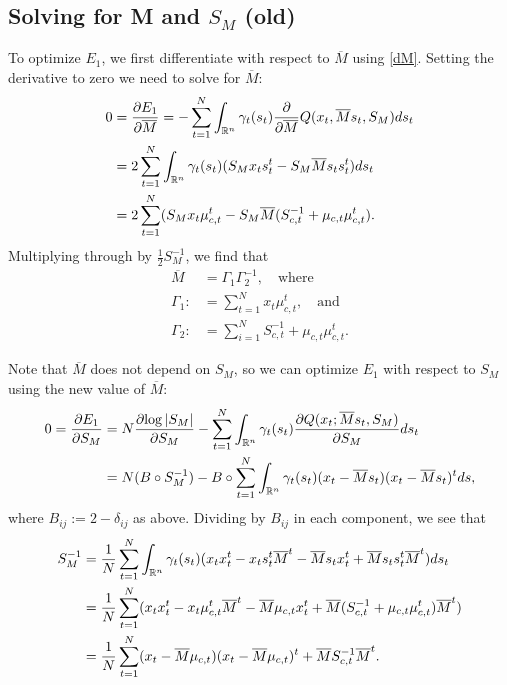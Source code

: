 \documentclass[12pt,leqno]{article}
\begin{document}
\subsection{Solving for M and $S_M$ (old)}
To optimize $E_1$, we first differentiate with respect to $\overline{M}$ using \eqref{dM}.
Setting the derivative to zero we need to solve for $\overline{M}$:
\begin{align*}
  0 &= \frac{\partial{E_1}}{\partial\overline{M}}
  = -\sum_{t=1}^N\int_{{\mathbb R}^n}\gamma_t(s_t)\frac{\partial}{\partial\overline{M}}Q(x_t,\overline{M}s_t,S_M)ds_t\\
  &= 2\sum_{t=1}^N\int_{{\mathbb R}^n}\gamma_t(s_t)(S_Mx_ts_t^t - S_M\overline{M}s_ts_t^t)ds_t\\
  &= 2\sum_{t=1}^N(S_Mx_t\mu_{c,t}^t - S_M\overline{M}(S_{c,t}^{-1} + \mu_{c,t}\mu_{c,t}^t).
\end{align*}
Multiplying through by $\frac{1}{2}S_M^{-1}$, we find that
\begin{equation}\label{M_bar}
  \begin{split}
    \overline{M} &= \Gamma_1\Gamma_2^{-1}, \quad\text{where}\\
    \Gamma_1 :&= \sum_{t=1}^Nx_t\mu_{c,t}^t, \quad\text{and}\\
    \Gamma_2 :&= \sum_{i=1}^NS_{c,t}^{-1} + \mu_{c,t}\mu_{c,t}^t.
  \end{split}
\end{equation}

Note that $\overline{M}$ does not depend on $S_M$, so we can optimize $E_1$ with respect to $S_M$
using the new value of $\overline{M}$:
\begin{align*}
  0 = \frac{\partial{E_1}}{\partial{S_M}} &=
   N\frac{\partial{\log|S_M|}}{\partial{S_M}}
  - \sum_{t=1}^N\int_{{\mathbb R}^n}\gamma_t(s_t)\frac{\partial{Q(x_t;\overline{M}s_t,S_M)}}{\partial{S_M}}ds_t \\
  &= N(B\circ{S}_M^{-1}) - B\circ\sum_{t=1}^N
  \int_{{\mathbb R}^n}\gamma_t(s_t)(x_t-\overline{M}s_t)(x_t-\overline{M}s_t)^tds,
\end{align*}
where $B_{ij} := 2-\delta_{ij}$ as above.  Dividing by $B_{ij}$ in each component, we see that
\begin{equation}\label{S_x}
  \begin{split}
    S_M^{-1} &= \frac{1}{N}\sum_{t=1}^N\int_{{\mathbb R}^n}\gamma_t(s_t)(x_tx_t^t - x_ts_t^t\overline{M}^t
    - \overline{M}s_tx_t^t + \overline{M}s_ts_t^t\overline{M}^t)ds_t \\
    &= \frac{1}{N}\sum_{t=1}^N(x_tx_t^t - x_t\mu_{c,t}^t\overline{M}^t - \overline{M}\mu_{c,t}x_t^t +
    \overline{M}(S_{c,t}^{-1}+\mu_{c,t}\mu_{c,t}^t)\overline{M}^t)\\
    &= \frac{1}{N}\sum_{t=1}^N(x_t-\overline{M}\mu_{c,t})(x_t-\overline{M}\mu_{c,t})^t +
    \overline{M}S_{c,t}^{-1}\overline{M}^t.
  \end{split}
\end{equation}
\end{document}
